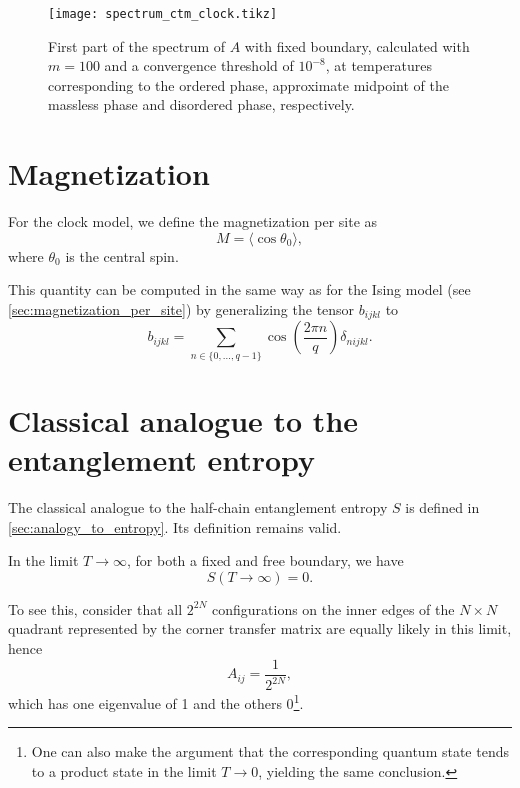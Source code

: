 \begin{figure}
  \texttt{[image: spectrum\_ctm\_clock.tikz]}
  \caption{First part of the spectrum of $A$ with fixed boundary,
  calculated with $m = 100$ and a convergence threshold of $10^{-8}$,
  at temperatures corresponding to the ordered phase, approximate midpoint of the massless phase and disordered phase,
  respectively.}\label{fig:spectrum_ctm_clock}
\end{figure}

\section{Magnetization}

For the clock model, we define the magnetization per site as
\begin{equation}\label{eq:magnetization_clock_model}
  M = \langle \cos \theta_0 \rangle,
\end{equation}
where $\theta_0$ is the central spin.

This quantity can be computed in the same way as for the Ising model (see \autoref{sec:magnetization_per_site}) by
generalizing the tensor $b_{i j k l}$ to
\begin{equation}
  b_{i j k l} = \sum_{n \in \{ 0, \dots, q-1 \}} \cos \left( \frac{2\pi n}{q} \right) \delta_{n i j k l}.
\end{equation}

\section{Classical analogue to the entanglement entropy}

The classical analogue to the half-chain entanglement entropy $S$ is defined in \autoref{sec:analogy_to_entropy}.
Its definition remains valid.

In the limit $T \to \infty$, for both a fixed and free boundary, we have
\begin{equation}
  S(T \to \infty) = 0.
\end{equation}

To see this, consider that all $2^{2N}$ configurations on the inner edges of the $N \times N$ quadrant represented by
the corner transfer matrix are equally likely in this limit, hence
\begin{equation}
  A_{i j} = \frac{1}{2^{2N}},
\end{equation}
which has one eigenvalue of 1 and the others 0\footnote{One can also make the argument that the corresponding
quantum state tends to a product state in the limit $T \to 0$,
yielding the same conclusion.}.

